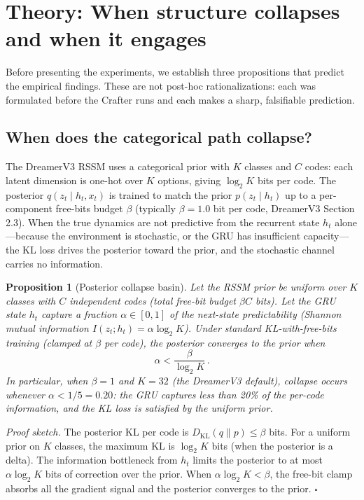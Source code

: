 \documentclass[preprint,12pt]{article}
\newtheorem{proposition}{Proposition}[section]
\begin{document}
\section{Theory: When structure collapses and when it engages}

Before presenting the experiments, we establish three propositions that
predict the empirical findings. These are not post-hoc rationalizations: each
was formulated before the Crafter runs and each makes a sharp, falsifiable
prediction.

\subsection{When does the categorical path collapse?}

The DreamerV3 RSSM uses a categorical prior with $K$ classes and $C$ codes:
each latent dimension is one-hot over $K$ options, giving $\log_2 K$ bits per
code. The posterior $q(z_t \mid h_t, x_t)$ is trained to match the prior
$p(z_t \mid h_t)$ up to a per-component free-bits budget $\beta$ (typically
$\beta = 1.0$ bit per code, DreamerV3 Section 2.3). When the true dynamics
are not predictive from the recurrent state $h_t$ alone---because the
environment is stochastic, or the GRU has insufficient capacity---the
KL loss drives the posterior toward the prior, and the stochastic channel
carries no information.

\begin{proposition}[Posterior collapse basin]\label{prop:collapse}
Let the RSSM prior be uniform over $K$ classes with $C$ independent codes
(total free-bit budget $\beta C$ bits). Let the GRU state $h_t$ capture
a fraction $\alpha \in [0,1]$ of the next-state predictability
(Shannon mutual information $I(z_t ; h_t) = \alpha \log_2 K$). Under
standard KL-with-free-bits training (clamped at $\beta$ per code), the
posterior converges to the prior when
\begin{equation}\label{eq:collapse}
  \alpha < \frac{\beta}{\log_2 K} \,.
\end{equation}
In particular, when $\beta = 1$ and $K = 32$ (the DreamerV3 default),
collapse occurs whenever $\alpha < 1/5 = 0.20$: the GRU captures less
than 20\% of the per-code information, and the KL loss is satisfied by
the uniform prior.
\end{proposition}

\textit{Proof sketch.} The posterior KL per code is
$D_{\mathrm{KL}}(q \| p) \leq \beta$ bits. For a uniform prior on $K$
classes, the maximum KL is $\log_2 K$ bits (when the posterior is a delta).
The information bottleneck from $h_t$ limits the posterior to at most
$\alpha \log_2 K$ bits of correction over the prior. When
$\alpha \log_2 K < \beta$, the free-bit clamp absorbs all the gradient
signal and the posterior converges to the prior. $\square$
\end{document}
